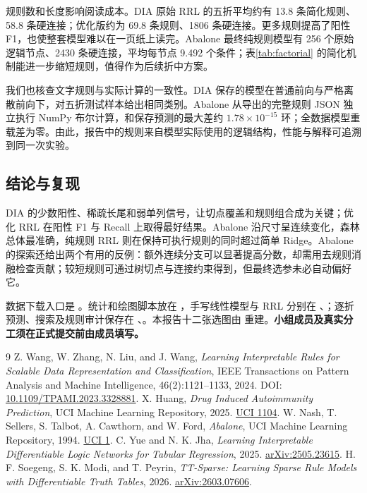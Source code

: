 \documentclass[UTF8,a4paper,11pt]{ctexart}
\begin{document}
规则数和长度影响阅读成本。DIA 原始 RRL 的五折平均约有 13.8 条简化规则、58.8 条硬连接；优化版约为 69.8 条规则、1806 条硬连接。更多规则提高了阳性 F1，也使整套模型难以在一页纸上读完。Abalone 最终纯规则模型有 256 个原始逻辑节点、2430 条硬连接，平均每节点 9.492 个条件；表\ref{tab:factorial} 的简化机制能进一步缩短规则，值得作为后续折中方案。

我们也核查文字规则与实际计算的一致性。DIA 保存的模型在普通前向与严格离散前向下，对五折测试样本给出相同类别。Abalone 从导出的完整规则 JSON 独立执行 NumPy 布尔计算，和保存预测的最大差约 $1.78\times10^{-15}$ 环；全数据模型重载差为零。由此，报告中的规则来自模型实际使用的逻辑结构，性能与解释可追溯到同一次实验。

\subsection{结论与复现}

DIA 的少数阳性、稀疏长尾和弱单列信号，让切点覆盖和规则组合成为关键；优化 RRL 在阳性 F1 与 Recall 上取得最好结果。Abalone 沿尺寸呈连续变化，森林总体最准确，纯规则 RRL 则在保持可执行规则的同时超过简单 Ridge。Abalone 的探索还给出两个有用的反例：额外连续分支可以显著提高分数，却需用去规则消融检查贡献；较短规则可通过树切点与连接约束得到，但最终选参未必自动偏好它。

数据下载入口是 。统计和绘图脚本放在 ，手写线性模型与 RRL 分别在 、；逐折预测、搜索及规则审计保存在 、。本报告十二张选图由  重建。\textbf{小组成员及真实分工须在正式提交前由成员填写。}

{\footnotesize
\begin{thebibliography}{9}
\setlength{\itemsep}{-1pt}
 Z. Wang, W. Zhang, N. Liu, and J. Wang, \emph{Learning Interpretable Rules for Scalable Data Representation and Classification}, IEEE Transactions on Pattern Analysis and Machine Intelligence, 46(2):1121--1133, 2024. DOI: \href{https://doi.org/10.1109/TPAMI.2023.3328881}{10.1109/TPAMI.2023.3328881}.
 X. Huang, \emph{Drug Induced Autoimmunity Prediction}, UCI Machine Learning Repository, 2025. \href{https://archive.ics.uci.edu/dataset/1104/drug_induced_autoimmunity_prediction}{UCI 1104}.
 W. Nash, T. Sellers, S. Talbot, A. Cawthorn, and W. Ford, \emph{Abalone}, UCI Machine Learning Repository, 1994. \href{https://archive.ics.uci.edu/dataset/1/abalone}{UCI 1}.
 C. Yue and N. K. Jha, \emph{Learning Interpretable Differentiable Logic Networks for Tabular Regression}, 2025. \href{https://arxiv.org/abs/2505.23615}{arXiv:2505.23615}.
 H. F. Soegeng, S. K. Modi, and T. Peyrin, \emph{TT-Sparse: Learning Sparse Rule Models with Differentiable Truth Tables}, 2026. \href{https://arxiv.org/abs/2603.07606}{arXiv:2603.07606}.
\end{thebibliography}
}
\end{document}
